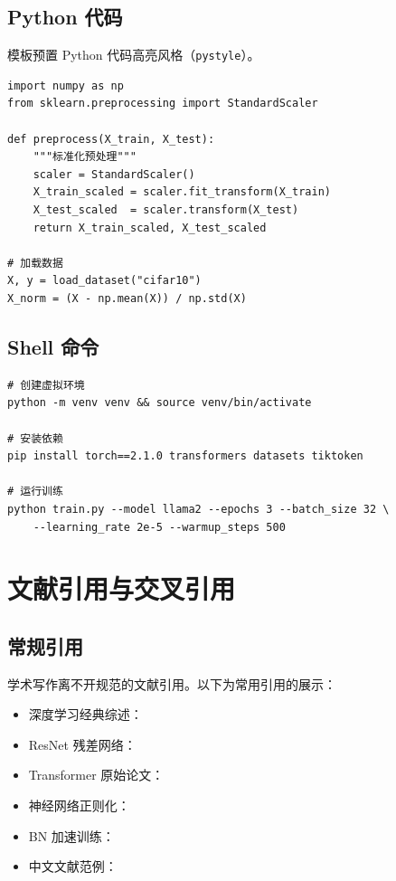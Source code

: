 \documentclass{harryopo-report}
\begin{document}
\section{Python 代码}

模板预置 Python 代码高亮风格（\texttt{pystyle}）。

\begin{lstlisting}[style=pystyle, caption={数据预处理示例}, label=lst:preprocess]
import numpy as np
from sklearn.preprocessing import StandardScaler

def preprocess(X_train, X_test):
    """标准化预处理"""
    scaler = StandardScaler()
    X_train_scaled = scaler.fit_transform(X_train)
    X_test_scaled  = scaler.transform(X_test)
    return X_train_scaled, X_test_scaled

# 加载数据
X, y = load_dataset("cifar10")
X_norm = (X - np.mean(X)) / np.std(X)
\end{lstlisting}

\section{Shell 命令}

\begin{lstlisting}[style=bashstyle, caption={环境配置}, label=lst:env]
# 创建虚拟环境
python -m venv venv && source venv/bin/activate

# 安装依赖
pip install torch==2.1.0 transformers datasets tiktoken

# 运行训练
python train.py --model llama2 --epochs 3 --batch_size 32 \
    --learning_rate 2e-5 --warmup_steps 500
\end{lstlisting}

\chapter{文献引用与交叉引用}

\section{常规引用}

学术写作离不开规范的文献引用。以下为常用引用的展示：

\begin{itemize}
    \item 深度学习经典综述：\cite{lecun2015deep}
    \item ResNet 残差网络：\cite{he2016deep}
    \item Transformer 原始论文：\cite{vaswani2017attention}
    \item 神经网络正则化：\cite{srivastava2014dropout}
    \item BN 加速训练：\cite{ioffe2015batch}
    \item 中文文献范例：\cite{zhou2016machine}
\end{itemize}
\end{document}
